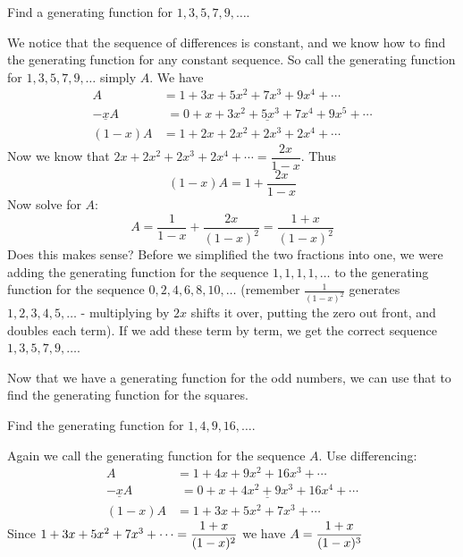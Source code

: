 \documentclass[12pt]{article}
\begin{document}
\begin{example}
 Find a generating function for $1, 3, 5, 7, 9,\ldots$.
 \begin{solution}
  We notice that the sequence of differences is constant, and we know how to find the generating function for any constant sequence.  So call the generating function for $1, 3, 5, 7, 9, \ldots$ simply $A$.  We have
  \begin{align*}
   A & = 1 + 3x + 5x^2 + 7x^3 + 9x^4 + \cdots \\
   \underline{-xA} & \underline{\,\,= 0 + x + 3x^2 +  5x^3 + 7x^4 + 9x^5 + \cdots} \\
   (1-x)A & = 1 + 2x + 2x^2 + 2x^3 + 2x^4 + \cdots
  \end{align*}
  Now we know that $2x + 2x^2 + 2x^3 + 2x^4 + \cdots = \dfrac{2x}{1-x}$.  Thus
  \[(1-x)A = 1 + \frac{2x}{1-x}\]
  Now solve for $A$:
  \[A = \frac{1}{1-x} + \frac{2x}{(1-x)^2} = \frac{1+x}{(1-x)^2}\]
  Does this makes sense?  Before we simplified the two fractions into one, we were adding the generating function for the sequence $1,1,1,1,\ldots$ to the generating function for the sequence $0, 2, 4, 6, 8, 10, \ldots$ (remember $\frac{1}{(1-x)^2}$ generates $1,2,3,4,5, \ldots$ - multiplying by $2x$ shifts it over, putting the zero out front, and doubles each term).  If we add these term by term, we get the correct sequence $1,3,5,7, 9, \ldots$.
 \end{solution}

\end{example}


Now that we have a generating function for the odd numbers, we can use that to find the generating function for the squares.

\begin{example}
 Find the generating function for $1, 4, 9, 16, \ldots$.
 \begin{solution}
  Again we call the generating function for the sequence $A$.  Use differencing:
  \begin{align*}
   A & = 1 + 4x + 9x^2 + 16x^3 + \cdots \\
   \underline{- xA} & \underline{\,\, = 0 + x + 4x^2 + 9x^3 + 16x^4 + \cdots} \\
   (1-x)A & = 1 + 3x + 5x^2 + 7x^3 + \cdots
  \end{align*}
Since $1 + 3x + 5x^2 + 7x^3 + \cdots = \displaystyle\frac{1+x}{(1-x)^2}$ we have $A = \displaystyle\frac{1+x}{(1-x)^3}$
 \end{solution}
\end{example}
\end{document}
